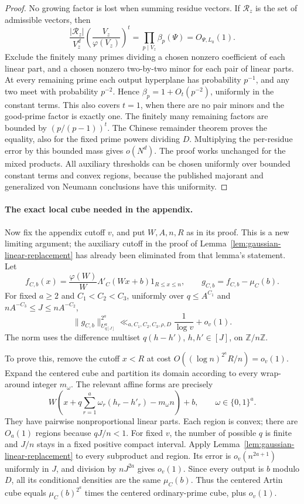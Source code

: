 \documentclass[11pt]{article}
\theoremstyle{definition}
\theoremstyle{remark}
\newcommand{\Z}{\mathbb Z}
\begin{document}
\begin{proof}
No growing factor is lost when summing residue vectors. If
$\mathcal R_z$ is the set of admissible vectors, then
\begin{equation}\label{eq:gaussian-admissibility-mass}
 \frac{|\mathcal R_z|}{V_z^d}
       \left(\frac{V_z}{\varphi(V_z)}\right)^t
   =\prod_{p\mid V_z}\beta_p(\Psi)=O_{\Psi,L_0}(1).
\end{equation}
Exclude the finitely many primes dividing a chosen nonzero
coefficient of each linear part, and a chosen nonzero two-by-two
minor for each pair of linear parts. At every remaining prime each
output hyperplane has probability $p^{-1}$, and any two meet with
probability $p^{-2}$. Hence $\beta_p=1+O_t(p^{-2})$, uniformly in
the constant terms. This also covers $t=1$, when there are no pair
minors and the good-prime factor is exactly one.
The finitely many remaining factors are bounded by $(p/(p-1))^t$.
The Chinese remainder theorem proves the equality, also for the fixed
prime powers dividing $D$. Multiplying the per-residue error by this
bounded mass gives $o(N^d)$. The proof works unchanged for the mixed
products. All auxiliary thresholds can be chosen uniformly over bounded
constant terms and convex regions, because the published majorant and
generalized von Neumann conclusions have this uniformity.
\end{proof}

\paragraph{The exact local cube needed in the appendix.}
Now fix the appendix cutoff $v$, and put $W,A,n,R$ as in its proof.
This is a new limiting argument; the auxiliary cutoff in the proof of
Lemma~\ref{lem:gaussian-linear-replacement} has already been eliminated
from that lemma's statement. Let
\[
 f_{C,b}(x)=\frac{\varphi(W)}W\Lambda'_C(Wx+b)1_{R\leq x\leq n},
 \qquad g_{C,b}=f_{C,b}-\mu_C(b).
\]
For fixed $a\geq2$ and $C_1<C_2<C_3$, uniformly over
$q\leq A^{C_1}$ and $nA^{-C_3}\leq J\leq nA^{-C_2}$,
\begin{equation}\label{eq:gaussian-global-gowers}
 \|g_{C,b}\|_{U^a_{q[J]}}^{2^a}
       \ll_{a,C_1,C_2,C_3,\rho,D}\frac1{\log v}+o_v(1).
\end{equation}
The norm uses the difference multiset $q(h-h')$, $h,h'\in[J]$, on
$\Z/n\Z$.

To prove this, remove the cutoff $x<R$ at cost
$O((\log n)^{2^a}R/n)=o_v(1)$. Expand the centered cube and partition
its domain according to every wrap-around integer $m_\omega$.
The relevant affine forms are precisely
\[
 W\left(x+q\sum_{r=1}^a\omega_r(h_r-h'_r)-m_\omega n\right)+b,
 \qquad\omega\in\{0,1\}^a.
\]
They have pairwise nonproportional linear parts. Each region is convex;
there are $O_a(1)$ regions because $qJ/n<1$. For fixed $v$, the number
of possible $q$ is finite and $J/n$ stays in a fixed positive compact
interval. Apply Lemma~\ref{lem:gaussian-linear-replacement} to every
subproduct and region. Its error is $o_v(n^{2a+1})$ uniformly in $J$,
and division by $nJ^{2a}$ gives $o_v(1)$. Since every output is $b$
modulo $D$, all its conditional densities are the same $\mu_C(b)$.
Thus the centered Artin cube equals $\mu_C(b)^{2^a}$ times the
centered ordinary-prime cube, plus $o_v(1)$.
\end{document}
